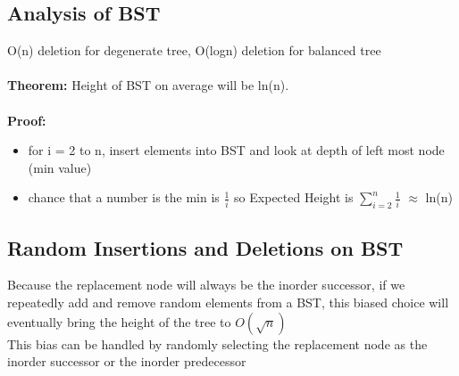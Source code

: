 \documentclass{article}
\begin{document}
  \subsection{Analysis of BST}
  O(n) deletion for degenerate tree, O(logn) deletion for balanced tree\\ \\
  \textbf{Theorem: } Height of BST on average will be ln(n). \\ \\
  \textbf{Proof: } 
  \begin{itemize}[noitemsep]
  \item for i = 2 to n, insert elements into BST and look at depth of left most node (min value)
  \item chance that a number is the min is $\frac{1}{i}$ so Expected Height is $\sum_{i=2}^{n} \frac{1}{i}$ $\approx$ ln(n)
  \end{itemize}
  \subsection{Random Insertions and Deletions on BST}
  Because the replacement node will always be the inorder successor, if we repeatedly add and remove random elements from a BST, this biased choice will eventually bring the height of the tree to $O(\sqrt{n})$\\
  This bias can be handled by randomly selecting the replacement node as the inorder successor or the inorder predecessor
  \newpage
\end{document}
